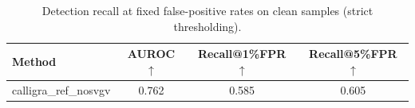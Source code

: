 \begin{table}[t]
\centering
\small
\begin{tabular}{lccc}
\toprule
Method & AUROC$\uparrow$ & Recall@1\%FPR$\uparrow$ & Recall@5\%FPR$\uparrow$ \\
\midrule
calligra\_ref\_nosvgv & 0.762 & 0.585 & 0.605 \\
\bottomrule
\end{tabular}
\caption{Detection recall at fixed false-positive rates on clean samples (strict thresholding).}
\label{tab:detection_fpr_single}
\end{table}
